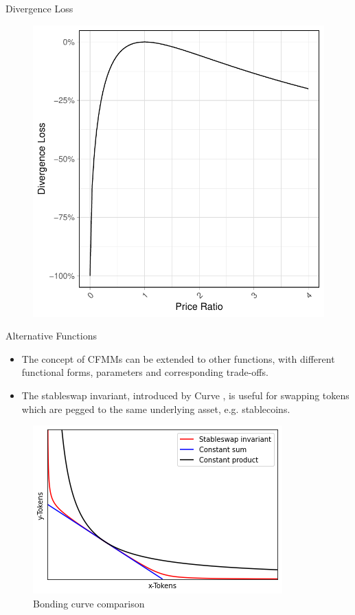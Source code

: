 \documentclass[handout]{beamer}
\begin{document}
\begin{frame}{Divergence Loss}
	\begin{figure}
		\includegraphics[scale=0.6]{../assets/images/divergence-loss.pdf}
	\end{figure}
\end{frame}


\begin{frame}{Alternative Functions}

\begin{small}
\begin{itemize}
	\item The concept of CFMMs can be extended to other functions, with different functional forms, parameters and corresponding trade-offs. 
	\item The stableswap invariant, introduced by Curve \cite{CRV}, is useful for swapping tokens which are pegged to the same underlying asset, e.g. stablecoins.
	\end{itemize}
\end{small}

	\begin{figure}
		\includegraphics[scale=0.5]{../assets/images/bonding-curves.png}
		\caption*{Bonding curve comparison \cite{CRV}}
	\end{figure}
	
\end{frame}
\end{document}

